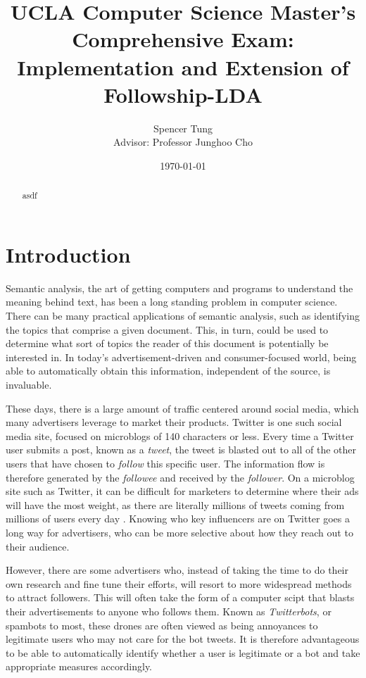 \documentclass[a4paper]{article}
\title{UCLA Computer Science Master's Comprehensive Exam: Implementation and Extension of Followship-LDA}
\author{Spencer Tung \\ Advisor: Professor Junghoo Cho}
\date{\today}
\begin{document}
\maketitle

\begin{abstract}
asdf
\end{abstract}

\section{Introduction}
Semantic analysis, the art of getting computers and programs to understand the meaning behind text, has been a long standing problem in computer science. There can be many practical applications of semantic analysis, such as identifying the topics that comprise a given document. This, in turn, could be used to determine what sort of topics the reader of this document is potentially be interested in. In today's advertisement-driven and consumer-focused world, being able to automatically obtain this information, independent of the source, is invaluable.

These days, there is a large amount of traffic centered around social media, which many advertisers leverage to market their products. Twitter is one such social media site, focused on microblogs of 140 characters or less. Every time a Twitter user submits a post, known as a \textit{tweet}, the tweet is blasted out to all of the other users that have chosen to \textit{follow} this specific user. The information flow is therefore generated by the \textit{followee} and received by the \textit{follower}. On a microblog site such as Twitter, it can be difficult for marketers to determine where their ads will have the most weight, as there are literally millions of tweets coming from millions of users every day \cite{TODO}. Knowing who key influencers are on Twitter goes a long way for advertisers, who can be more selective about how they reach out to their audience.

However, there are some advertisers who, instead of taking the time to do their own research and fine tune their efforts, will resort to more widespread methods to attract followers. This will often take the form of a computer scipt that blasts their advertisements to anyone who follows them. Known as \textit{Twitterbots}, or spambots to most, these drones are often viewed as being annoyances to legitimate users who may not care for the bot tweets. It is therefore advantageous to be able to automatically identify whether a user is legitimate or a bot and take appropriate measures accordingly.
\end{document}
